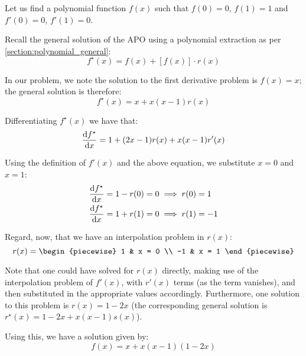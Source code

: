 \begin{example}
    Let us find a polynomial function $f(x)$ such that $f(0)=0$, $f(1)=1$ and $f'(0)=0$, $f'(1)=0$.

    Recall the general solution of the APO using a polynomial extraction as per \autoref{section:polynomial_general}:
    $$
        f^\star(x) = f(x) + [f(x)]\cdot r(x)
    $$

    In our problem, we note the solution to the first derivative problem is $f(x)=x$; the general solution is therefore:
    $$
        f^\star(x) = x + x(x-1)r(x)
    $$

    Differentiating $f^\star(x)$ we have that:
    $$
        \dv{f^\star}{x} = 1 + (2x-1)r(x) + x(x-1)r'(x)
    $$

    Using the definition of $f'(x)$ and the above equation, we substitute $x=0$ and $x=1$:
    \begin{align*}
        \dv{f^\star}{x}(0) = 1-r(0) &= 0 \implies r(0) =1 \\
        \dv{f^\star}{x}(1) = 1+r(1) &= 0 \implies r(1) =-1
    \end{align*}

    Regard, now, that we have an interpolation problem in $r(x)$:
    $$
        r(x) = \begin{piecewise}
            1 & x = 0 \\
            -1 & x = 1
        \end{piecewise}
    $$

    Note that one could have solved for $r(x)$ directly, making use of the interpolation problem of $f'(x)$, with $r'(x)$ terms (as the term vanishes), and then substituted in the appropriate values accordingly. Furthermore, one solution to this problem is $r(x)=1-2x$ (the corresponding general solution is $r^\star(x)=1-2x+x(x-1)s(x)$).

    Using this, we have a solution given by:
    $$
        f(x) = x + x(x-1)(1-2x)
    $$
\end{example}

